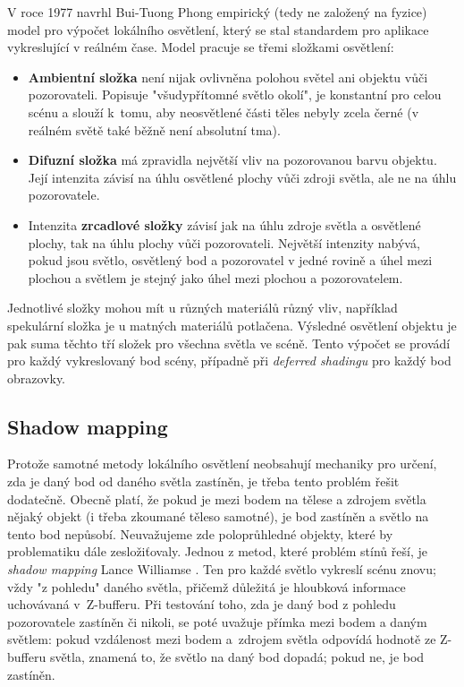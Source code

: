 V roce 1977 navrhl Bui-Tuong Phong \cite{PhongBui1975Ifcg} empirický (tedy ne založený na fyzice) model pro výpočet lokálního osvětlení, který se stal standardem pro aplikace vykreslující v reálném čase. Model pracuje se třemi složkami osvětlení:
\begin{itemize}
	\item \textbf{Ambientní složka} není nijak ovlivněna polohou světel ani objektu vůči pozorovateli. Popisuje "všudypřítomné světlo okolí", je konstantní pro celou scénu a slouží k~tomu, aby neosvětlené části těles nebyly zcela černé (v reálném světě také běžně není absolutní tma).
	\item \textbf{Difuzní složka} má zpravidla největší vliv na pozorovanou barvu objektu. Její intenzita závisí na úhlu osvětlené plochy vůči zdroji světla, ale ne na úhlu pozorovatele.
	\item Intenzita \textbf{zrcadlové složky} závisí jak na úhlu zdroje světla a osvětlené plochy, tak na úhlu plochy vůči pozorovateli. Největší intenzity nabývá, pokud jsou světlo, osvětlený bod a pozorovatel v jedné rovině a úhel mezi plochou a světlem je stejný jako úhel mezi plochou a pozorovatelem.
\end{itemize}

Jednotlivé složky mohou mít u různých materiálů různý vliv, například spekulární složka je u matných materiálů potlačena. Výsledné osvětlení objektu je pak suma těchto tří složek pro všechna světla ve scéně. Tento výpočet se provádí pro každý vykreslovaný bod scény, případně při \textit{deferred shadingu} pro každý bod obrazovky.

\subsection{Shadow mapping}
Protože samotné metody lokálního osvětlení neobsahují mechaniky pro určení, zda je daný bod od daného světla zastíněn, je třeba tento problém řešit dodatečně. Obecně platí, že pokud je mezi bodem na tělese a zdrojem světla nějaký objekt (i třeba zkoumané těleso samotné), je bod zastíněn a světlo na tento bod nepůsobí. Neuvažujeme zde poloprůhledné objekty, které by problematiku dále zesložiťovaly. Jednou z metod, které problém stínů řeší, je \textit{shadow mapping} Lance Williamse \cite{WilliamsLance1978Ccso}. Ten pro každé světlo vykreslí scénu znovu; vždy "z pohledu" daného světla, přičemž důležitá je hloubková informace uchovávaná \mbox{v~Z-bufferu}. Při testování toho, zda je daný bod z pohledu pozorovatele zastíněn či nikoli, se poté uvažuje přímka mezi bodem a daným světlem: pokud vzdálenost mezi bodem a~zdrojem světla odpovídá hodnotě ze Z-bufferu světla, znamená to, že světlo na daný bod dopadá; pokud ne, je bod zastíněn.

